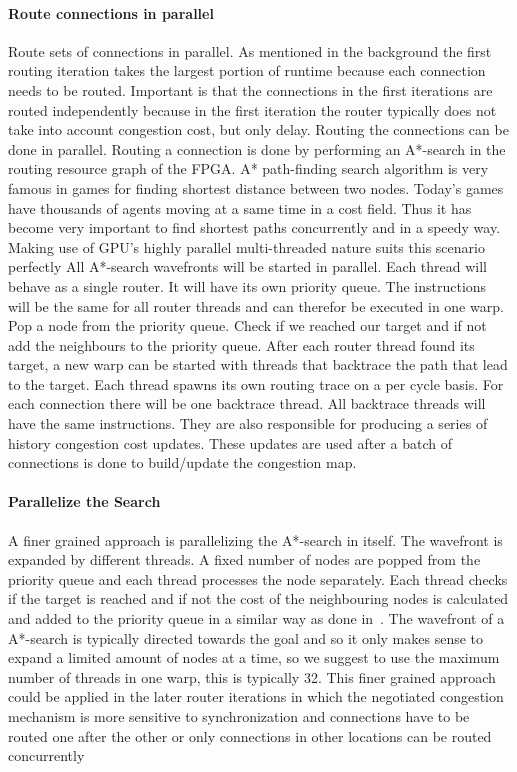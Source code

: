 \documentclass[a4paper,oneside,12pt]{article}
\begin{document}
\paragraph{Route connections in parallel} Route sets of connections in parallel.
As mentioned in the background the first routing iteration takes the largest portion of runtime because each connection needs to be routed.
Important is that the connections in the first iterations are routed independently because in the first iteration the router typically does not take into account congestion cost, but only delay. Routing the connections can be done in parallel. Routing a connection is done by performing an A*-search in the routing resource graph of the FPGA.
A* path-finding search algorithm is very famous in games for finding shortest distance between two nodes. Today's games have thousands of agents moving at a same time in a cost field. Thus it has become very important to find shortest paths concurrently and in a speedy way. Making use of GPU's highly parallel multi-threaded nature suits this scenario perfectly \cite{bleiweiss2008gpu,bleiweiss2012system}
 All A*-search wavefronts will be started in parallel. Each thread will behave as a single router. It will have its own priority queue. The instructions will be the same for all router threads and can therefor be executed in one warp. Pop a node from the priority queue. Check if we reached our target and if not add the neighbours to the priority queue. After each router thread found its target, a new warp can be started with threads that backtrace the path that lead to the target. Each thread spawns its own routing trace on a per cycle basis. For each connection there will be one backtrace thread. All backtrace threads will have the same instructions. They are also responsible for producing a series of history congestion cost updates. These updates are used after a batch of connections is done to build/update the congestion map.

\paragraph{Parallelize the Search}
A finer grained approach is parallelizing the A*-search in itself. The wavefront is expanded by different threads. A fixed number of nodes are popped from the priority queue and each thread processes the node separately. Each thread checks if the target is reached and if not the cost of the neighbouring nodes is calculated and added to the priority queue in a similar way as done in~\cite{Merrill2015}. The wavefront of a A*-search is typically directed towards the goal and so it only makes sense to expand a limited amount of nodes at a time, so we suggest to use the maximum number of threads in one warp, this is typically 32. This finer grained approach could be applied in the later router iterations in which the negotiated congestion mechanism is more sensitive to synchronization and connections have to be routed one after the other or only connections in other locations can be routed concurrently~\cite{gort2010deterministic}
\end{document}
